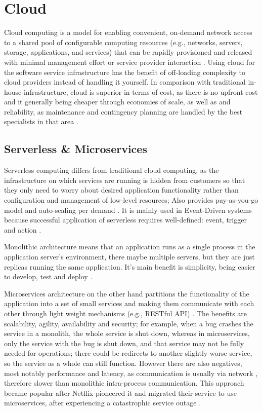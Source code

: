 \section{Cloud}
Cloud computing is a model for enabling convenient, on-demand network access to a shared pool of configurable computing
resources (e.g., networks, servers, storage, applications, and services) that can be rapidly provisioned and released with minimal management effort or service provider interaction \cite {cloudDef}.
Using cloud for the software service infrastructure has the benefit of off-loading complexity to cloud providers instead of handling it yourself. In comparison with traditional in-house infrastructure, cloud is superior in terms of cost, as there is no upfront cost and it generally being cheaper through economies of scale, as well as and reliability, as maintenance and contingency planning are handled by the best specialists in that area \cite{armbrust2009above, hajjat2010cloudward}.  
\subsection{Serverless \& Microservices}
Serverless computing differs from traditional cloud computing, as the infrastructure on which services are running is hidden from customers so that they only need to worry about desired application functionality rather than configuration and management of low-level resources; Also provides pay-as-you-go model and auto-scaling per demand \cite{serverless1}.  It is mainly used in Event-Driven systems because successful application of serverless requires well-defined: event, trigger and action \cite{MALAWSKI2020502, serverless2}. 

Monolithic architecture means that an application runs as a single process in the application server's environment, there maybe multiple servers, but they are just replicas running the same application. It's main benefit is simplicity, being easier to develop, test and deploy \cite{monolith}.

Microservices architecture on the other hand partitions the functionality of the application into a set of small services and making them communicate with each other through light weight mechanisms (e.g., RESTful API) \cite{fowler2014eb}. The benefits are scalability, agility, availability and security; for example, when a bug crashes the service in a monolith, the whole service is shut down, whereas in microservices, only the service with the bug is shut down, and that service may not be fully needed for operations; there could be redirects to another slightly worse service, so the service as a whole can still function. However there are also negatives, most notably performance and latency, as communication is usually via network \cite{Li2021Understanding}, therefore slower than monolithic intra-process communication. This approach became popular after Netflix pioneered it and migrated their service to use microservices, after experiencing a catastrophic service outage \cite{monolith}.
